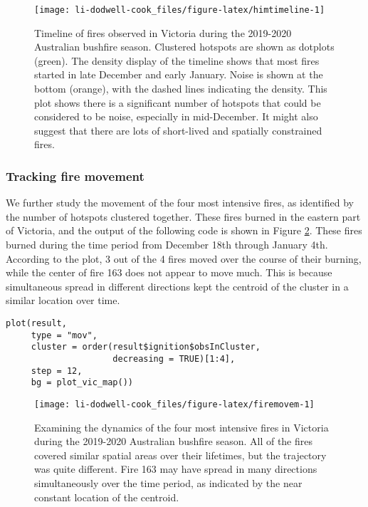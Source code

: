 \begin{figure}

{\centering \texttt{[image: li-dodwell-cook\_files/figure-latex/himtimeline-1]} 

}

\caption{Timeline of fires observed in Victoria during the 2019-2020 Australian bushfire season. Clustered hotspots are shown as dotplots (green). The density display of the timeline shows that most fires started in late December and early January. Noise is shown at the bottom (orange), with the dashed lines indicating the density. This plot shows there is a significant number of hotspots that could be considered to be noise, especially in mid-December. It might also suggest that there are lots of short-lived and spatially constrained fires.}\label{fig:himtimeline}
\end{figure}

\hypertarget{tracking-fire-movement}{%
\subsubsection{Tracking fire movement}\label{tracking-fire-movement}}

We further study the movement of the four most intensive fires, as identified by the number of hotspots clustered together. These fires burned in the eastern part of Victoria, and the output of the following code is shown in Figure \ref{fig:firemovem}. These fires burned during the time period from December 18th through January 4th. According to the plot, 3 out of the 4 fires moved over the course of their burning, while the center of fire 163 does not appear to move much. This is because simultaneous spread in different directions kept the centroid of the cluster in a similar location over time.

\begin{verbatim}
plot(result, 
     type = "mov", 
     cluster = order(result$ignition$obsInCluster,
                     decreasing = TRUE)[1:4], 
     step = 12, 
     bg = plot_vic_map())
\end{verbatim}

\begin{figure}

{\centering \texttt{[image: li-dodwell-cook\_files/figure-latex/firemovem-1]} 

}

\caption{Examining the dynamics of the four most intensive fires in Victoria during the 2019-2020 Australian bushfire season. All of the fires covered similar spatial areas over their lifetimes, but the trajectory was quite different. Fire 163 may have spread in many directions simultaneously over the time period, as indicated by the near constant location of the centroid.}\label{fig:firemovem}
\end{figure}

